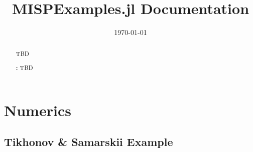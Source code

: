 



\title{MISPExamples.jl Documentation}
\author{}
\date{\today}
\begin{abstract}
  TBD

  \smallskip%
  \noindent\textbf{\keywordsname:} TBD
\end{abstract}
\maketitle%


\section{Numerics}

\subsection{Tikhonov \& Samarskii Example}



